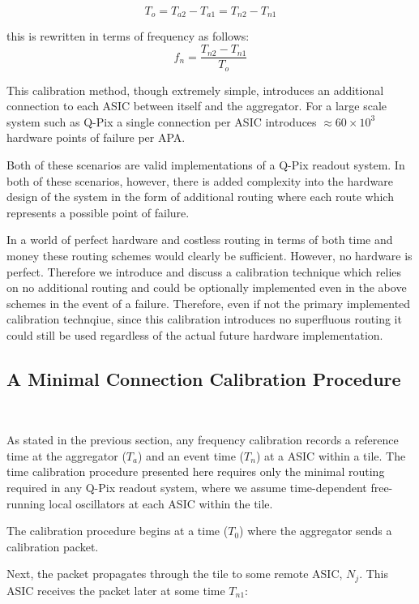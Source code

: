 \begin{equation}
  T_{o} = T_{a2} - T_{a1} = T_{n2} - T_{n1}
\end{equation}

this is rewritten in terms of frequency as follows:
\begin{equation}
  f_{n} = \frac{T_{n2} - T_{n1}}{T_{o}}
\end{equation}

This calibration method, though extremely simple, introduces an additional connection to each ASIC between itself and the aggregator.
For a large scale system such as Q-Pix a single connection per ASIC introduces $\approx 60\times 10^{3}$ hardware points of failure per APA.

Both of these scenarios are valid implementations of a Q-Pix readout system.
In both of these scenarios, however, there is added complexity into the hardware design of the system in the form of additional routing where each route which represents a possible point of failure.

In a world of perfect hardware and costless routing in terms of both time and money these routing schemes would clearly be sufficient.
However, no hardware is perfect.
Therefore we introduce and discuss a calibration technique which relies on no additional routing and could be optionally implemented even in the above schemes in the event of a failure.
Therefore, even if not the primary implemented calibration technqiue, since this calibration introduces no superfluous routing it could still be used regardless of the actual future hardware implementation.

\subsection{A Minimal Connection Calibration Procedure}~\label{sec:min_calib}

As stated in the previous section, any frequency calibration records a reference time at the aggregator ($T_{a}$) and an event time ($T_{n}$) at a ASIC within a tile.
The time calibration procedure presented here requires only the minimal routing required in any Q-Pix readout system, where we assume time-dependent free-running local oscillators at each ASIC within the tile.

The calibration procedure begins at a time ($T_{0}$) where the aggregator sends a calibration packet.

Next, the packet propagates through the tile to some remote ASIC, $N_{j}$.
This ASIC receives the packet later at some time $T_{n1}$:

